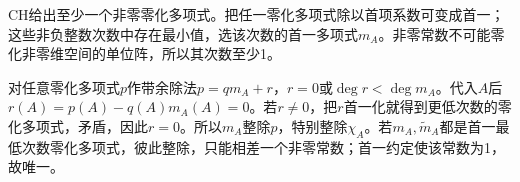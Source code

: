 \label{der:8-3}
CH给出至少一个非零零化多项式。把任一零化多项式除以首项系数可变成首一；这些非负整数次数中存在最小值，选该次数的首一多项式$m_A$。非零常数不可能零化非零维空间的单位阵，所以其次数至少1。

对任意零化多项式$p$作带余除法$p=qm_A+r$，$r=0$或$\deg r<\deg m_A$。代入$A$后$r(A)=p(A)-q(A)m_A(A)=0$。若$r\ne0$，把$r$首一化就得到更低次数的零化多项式，矛盾，因此$r=0$。所以$m_A$整除$p$，特别整除$\chi_A$。若$m_A,\widetilde m_A$都是首一最低次数零化多项式，彼此整除，只能相差一个非零常数；首一约定使该常数为1，故唯一。
